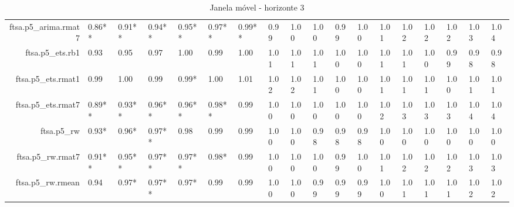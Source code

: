 \begin{table}[ht]
{\begin{tabular}{rlllllllllllllllll}
  ftsa.p5\_arima.rmat7 & 0.86** & 0.91** & 0.94** & 0.95** & 0.97** & 0.99** & 0.99 & 1.00 & 1.00 & 0.99 & 1.00 & 1.01 & 1.02 & 1.02 & 1.02 & 1.03 & 1.04 \\ 
  ftsa.p5\_ets.rb1 & 0.93 & 0.95 & 0.97 & 1.00 & 0.99 & 1.00 & 1.01 & 1.01 & 1.01 & 1.00 & 1.00 & 1.01 & 1.01 & 1.00 & 0.99 & 0.98 & 0.98 \\ 
  ftsa.p5\_ets.rmat1 & 0.99 & 1.00 & 0.99 & 0.99* & 1.00 & 1.01 & 1.02 & 1.02 & 1.01 & 1.00 & 1.00 & 1.01 & 1.01 & 1.01 & 1.00 & 1.01 & 1.01 \\ 
  ftsa.p5\_ets.rmat7 & 0.89** & 0.93** & 0.96** & 0.96** & 0.98** & 0.99 & 1.00 & 1.00 & 1.00 & 1.00 & 1.00 & 1.02 & 1.03 & 1.03 & 1.03 & 1.04 & 1.04 \\ 
  ftsa.p5\_rw & 0.93* & 0.96* & 0.97** & 0.98 & 0.99 & 0.99 & 1.00 & 1.00 & 0.98 & 0.98 & 0.98 & 1.00 & 1.00 & 1.00 & 1.00 & 1.00 & 1.00 \\ 
  ftsa.p5\_rw.rmat7 & 0.91** & 0.95** & 0.97** & 0.97** & 0.98* & 0.99 & 1.00 & 1.00 & 1.00 & 0.99 & 1.00 & 1.01 & 1.02 & 1.02 & 1.02 & 1.03 & 1.03 \\ 
  ftsa.p5\_rw.rmean & 0.94 & 0.97* & 0.97** & 0.97* & 0.99 & 0.99 & 1.00 & 1.00 & 0.99 & 0.99 & 0.99 & 1.00 & 1.01 & 1.01 & 1.01 & 1.02 & 1.02 \\ 
   \hline
\end{tabular}
}
\caption{Janela móvel - horizonte 3} 
\end{table}
